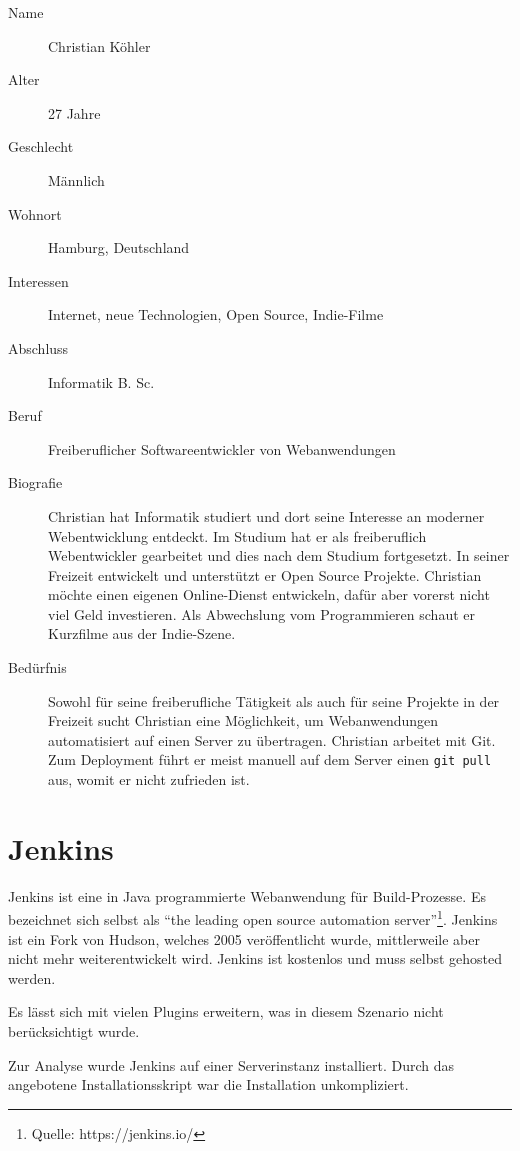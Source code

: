 \begin{description}
  \item [Name] Christian Köhler
  \item [Alter] 27 Jahre
  \item [Geschlecht] Männlich
  \item [Wohnort] Hamburg, Deutschland
  \item [Interessen] Internet, neue Technologien, Open Source, Indie-Filme
  \item [Abschluss] Informatik B. Sc.
  \item [Beruf] Freiberuflicher Softwareentwickler von Webanwendungen
  \item [Biografie] Christian hat Informatik studiert und dort seine Interesse an moderner Webentwicklung entdeckt. Im Studium hat er als freiberuflich Webentwickler gearbeitet und dies nach dem Studium fortgesetzt. In seiner Freizeit entwickelt und unterstützt er Open Source Projekte. Christian möchte einen eigenen Online-Dienst entwickeln, dafür aber vorerst nicht viel Geld investieren. Als Abwechslung vom Programmieren schaut er Kurzfilme aus der Indie-Szene.
  \item [Bedürfnis] Sowohl für seine freiberufliche Tätigkeit als auch für seine Projekte in der Freizeit sucht Christian eine Möglichkeit, um Webanwendungen automatisiert auf einen Server zu übertragen. Christian arbeitet mit Git. Zum Deployment führt er meist manuell auf dem Server einen \texttt{git pull} aus, womit er nicht zufrieden ist.
\end{description}

\section{Jenkins}
\label{sec:analyse-jenkins}

Jenkins ist eine in Java programmierte Webanwendung für Build-Prozesse. Es bezeichnet sich selbst als ``the leading open source automation server''\footnote{Quelle: https://jenkins.io/}. Jenkins ist ein Fork von Hudson, welches 2005 veröffentlicht wurde, mittlerweile aber nicht mehr weiterentwickelt wird. Jenkins ist kostenlos und muss selbst gehosted werden.

Es lässt sich mit vielen Plugins erweitern, was in diesem Szenario nicht berücksichtigt wurde.

Zur Analyse wurde Jenkins auf einer Serverinstanz installiert. Durch das angebotene Installationsskript war die Installation unkompliziert.


